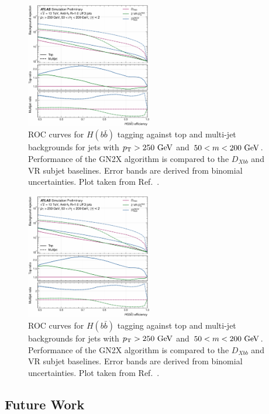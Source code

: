 \begin{figure}
    \centering
    \includegraphics[width=0.49\textwidth]{figures/flavour_tagging/gn2x.pdf}
    \caption{ROC curves for $H(b\bar{b})$ tagging against top and multi-jet backgrounds for jets with $\pt>250~\GeV$ and $50<m<200~\GeV$. Performance of the GN2X algorithm is compared to the $D_{Xbb}$ and VR subjet baselines. Error bands are derived from binomial uncertainties. Plot taken from Ref.~\cite{GN2X}.}
    \label{fig:gn2x}
\end{figure}

\begin{figure}
    \centering
    \includegraphics[width=0.49\textwidth]{figures/flavour_tagging/gn2x.pdf}
    \caption{ROC curves for $H(b\bar{b})$ tagging against top and multi-jet backgrounds for jets with $\pt>250~\GeV$ and $50<m<200~\GeV$. Performance of the GN2X algorithm is compared to the $D_{Xbb}$ and VR subjet baselines. Error bands are derived from binomial uncertainties. Plot taken from Ref.~\cite{GN2X}.}
    \label{fig:gn2x}
\end{figure}

\subsection{Future Work}


